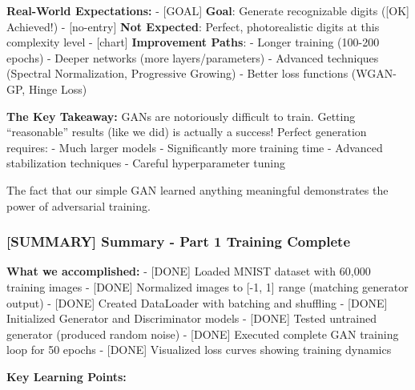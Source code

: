 \documentclass[11pt]{article}
\begin{document}
\textbf{Real-World Expectations:} - {[}GOAL{]} \textbf{Goal}: Generate
recognizable digits ({[}OK{]} Achieved!) - {[}no-entry{]} \textbf{Not
Expected}: Perfect, photorealistic digits at this complexity level -
{[}chart{]} \textbf{Improvement Paths}: - Longer training (100-200
epochs) - Deeper networks (more layers/parameters) - Advanced techniques
(Spectral Normalization, Progressive Growing) - Better loss functions
(WGAN-GP, Hinge Loss)

\textbf{The Key Takeaway:} GANs are notoriously difficult to train.
Getting ``reasonable'' results (like we did) is actually a success!
Perfect generation requires: - Much larger models - Significantly more
training time - Advanced stabilization techniques - Careful
hyperparameter tuning

The fact that our simple GAN learned anything meaningful demonstrates
the power of adversarial training.

    \subsubsection{{[}SUMMARY{]} Summary - Part 1 Training
Complete}\label{summary-summary---part-1-training-complete}

\textbf{What we accomplished:} - {[}DONE{]} Loaded MNIST dataset with
60,000 training images - {[}DONE{]} Normalized images to {[}-1, 1{]}
range (matching generator output) - {[}DONE{]} Created DataLoader with
batching and shuffling - {[}DONE{]} Initialized Generator and
Discriminator models - {[}DONE{]} Tested untrained generator (produced
random noise) - {[}DONE{]} Executed complete GAN training loop for 50
epochs - {[}DONE{]} Visualized loss curves showing training dynamics

\textbf{Key Learning Points:}
\end{document}
